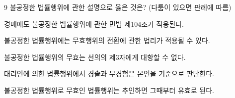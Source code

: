 \begin{question}{9}
불공정한 법률행위에 관한 설명으로 옳은 것은? (다툼이 있으면 판례에 따름)
\begin{choices}
  \item 경매에도 불공정한 법률행위에 관한 민법 제104조가 적용된다.
  \item 불공정한 법률행위에는 무효행위의 전환에 관한 법리가 적용될 수 있다.
  \item 불공정한 법률행위의 무효는 선의의 제3자에게 대항할 수 없다.
  \item 대리인에 의한 법률행위에서 경솔과 무경험은 본인을 기준으로 판단한다.
  \item 불공정한 법률행위로 무효인 법률행위는 추인하면 그때부터 유효로 된다.
\end{choices}
\end{question}
